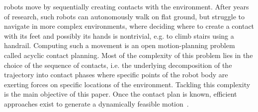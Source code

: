 \newcommand{\Pa}{$\mathcal{P}_1$ }
\newcommand{\Pb}{$\mathcal{P}_2$ }

 robots move by sequentially creating contacts with the environment.
After years of research, such robots can autonomously walk on flat ground, but struggle to navigate in more complex environments, where deciding where to create a contact with its feet and possibly its hands is nontrivial, e.g. to climb stairs using a handrail.
Computing such a movement is an open motion-planning problem called acyclic contact planning.
Most of the complexity of this problem lies in the choice of the sequence of contacts, i.e. the underlying decomposition of the trajectory into contact phases where specific points of the robot body are exerting forces on specific locations of the environment.
Tackling this complexity is the main objective of this paper.
%
Once the contact plan is known, efficient approaches exist to generate a dynamically feasible motion~\citep{Carpentier2016}. 



